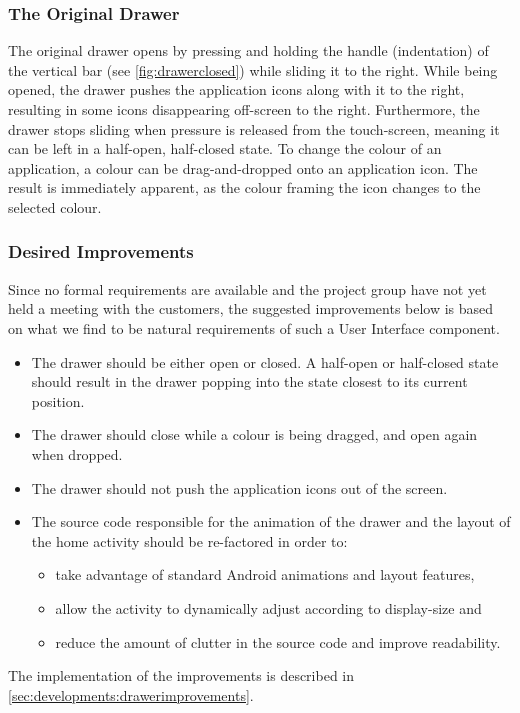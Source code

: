 \subsubsection{The Original Drawer}

The original drawer opens by pressing and holding the handle (indentation) of the vertical bar (see \cref{fig:drawerclosed}) while sliding it to the right.
While being opened, the drawer pushes the application icons along with it to the right, resulting in some icons disappearing off-screen to the right.
Furthermore, the drawer stops sliding when pressure is released from the touch-screen, meaning it can be left in a half-open, half-closed state.
To change the colour of an application, a colour can be drag-and-dropped onto an application icon. 
The result is immediately apparent, as the colour framing the icon changes to the selected colour.

\subsubsection{Desired Improvements}

Since no formal requirements are available and the project group have not yet held a meeting with the customers, the suggested improvements below is based on what we find to be natural requirements of such a User Interface component. 

\begin{itemize}
\item The drawer should be either open or closed. A half-open or half-closed state should result in the drawer popping into the state closest to its current position.
\item The drawer should close while a colour is being dragged, and open again when dropped.
\item The drawer should not push the application icons out of the screen.
\item The source code responsible for the animation of the drawer and the layout of the home activity should be re-factored in order to:
\begin{itemize}
\item take advantage of standard Android animations and layout features,
\item allow the activity to dynamically adjust according to display-size and
\item reduce the amount of clutter in the source code and improve readability.
\end{itemize}
\end{itemize}

The implementation of the improvements is described in \cref{sec:developments:drawerimprovements}.